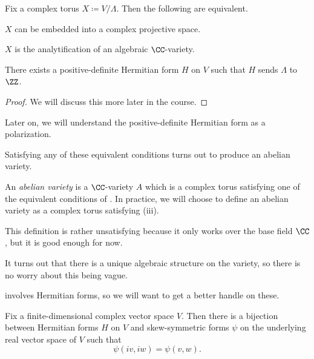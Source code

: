 \documentclass[../notes.tex]{subfiles}
\begin{document}
\begin{theorem} \label{thm:torus-to-ab-var}
	Fix a complex torus $X\coloneqq V/\Lambda$. Then the following are equivalent.
	\begin{listroman}
		\item $X$ can be embedded into a complex projective space.
		\item $X$ is the analytification of an algebraic $\CC$-variety.
		\item There exists a positive-definite Hermitian form $H$ on $V$ such that $H$ sends $\Lambda$ to $\ZZ$.
	\end{listroman}
\end{theorem}
\begin{proof}
	We will discuss this more later in the course.
\end{proof}
\begin{remark}
	Later on, we will understand the positive-definite Hermitian form as a polarization.
\end{remark}
Satisfying any of these equivalent conditions turns out to produce an abelian variety.
\begin{definition} \label{def:ab-var-c}
	An \textit{abelian variety} is a $\CC$-variety $A$ which is a complex torus satisfying one of the equivalent conditions of . In practice, we will choose to define an abelian variety as a complex torus satisfying (iii).
\end{definition}
This definition is rather unsatisfying because it only works over the base field $\CC$, but it is good enough for now.
\begin{remark}
	It turns out that there is a unique algebraic structure on the variety, so there is no worry about this being vague.
\end{remark}
 involves Hermitian forms, so we will want to get a better handle on these.
\begin{lemma} \label{lem:im-of-hermitian}
	Fix a finite-dimensional complex vector space $V$. Then there is a bijection between Hermitian forms $H$ on $V$ and skew-symmetric forms $\psi$ on the underlying real vector space of $V$ such that
	\[\psi(iv,iw)=\psi(v,w).\]
\end{lemma}
\end{document}
